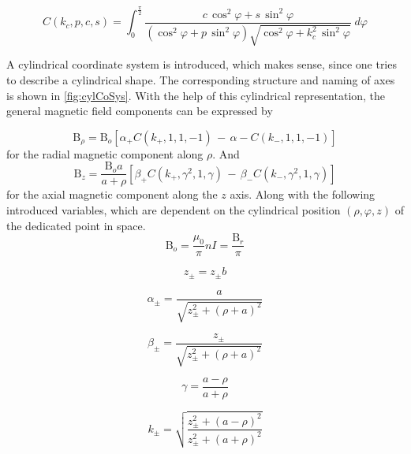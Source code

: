 \begin{equation}\label{eq:cel}
C(k_{c},p,c,s) = \int_{0}^{\frac{\pi}{2}} \frac{c \, \cos^{2}\varphi + s \, \sin^{2}\varphi}
{(\cos^{2}\varphi + p \, \sin^{2}\varphi)\sqrt{\cos^{2}\varphi + k_{c}^{2} \, \sin^{2}\varphi}} \; d\varphi
\end{equation}

A cylindrical coordinate system is introduced, which makes sense, since one tries to describe a cylindrical shape. The corresponding structure and naming of axes is shown in \ref{fig:cylCoSys}. With the help of this cylindrical representation, the general magnetic field components can be expressed by

\begin{equation} \label{eq:cylB_rho}
\mathrm{B}_{\rho} = \mathrm{B}_{o}[\alpha_{+} C(k_{+},1,1,-1) \, - \, \alpha{-} C(k_{-},1,1,-1)]
\end{equation}
for the radial magnetic component along $ \rho $. And
\begin{equation} \label{eq:cylB_z}
\mathrm{B}_{z} = \frac{\mathrm{B}_{o}a}{a+\rho}[\beta_{+} C(k_{+},\gamma^2,1,\gamma) \, - \, \beta_{-} C(k_{-},\gamma^2,1,\gamma)]
\end{equation}
for the axial magnetic component along the $ z $ axis. Along with the following introduced variables, which are dependent on the cylindrical position $ (\rho, \varphi, z) $ of the dedicated point in space.
\begin{equation}
\mathrm{B}_{o} = \frac{\mu_{0}}{\pi}nI = \frac{\mathrm{B}_{r}}{\pi}
\end{equation}

\begin{equation}
z_{\pm} = z_{\pm} b
\end{equation}

\begin{equation}
\alpha_{\pm} = \frac{a}{\sqrt{z_{\pm}^2+(\rho+a)^2}}
\end{equation}

\begin{equation}
\beta_{\pm} = \frac{z_{\pm}}{\sqrt{z_{\pm}^2+(\rho+a)^2}}
\end{equation}

\begin{equation}
\gamma = \frac{a-\rho}{a+\rho}
\end{equation}

\begin{equation}
k_{\pm} = \sqrt{\frac{z_{\pm}^2 + (a-\rho)^2}{z_{\pm}^2 + (a+\rho)^2}}
\end{equation}

